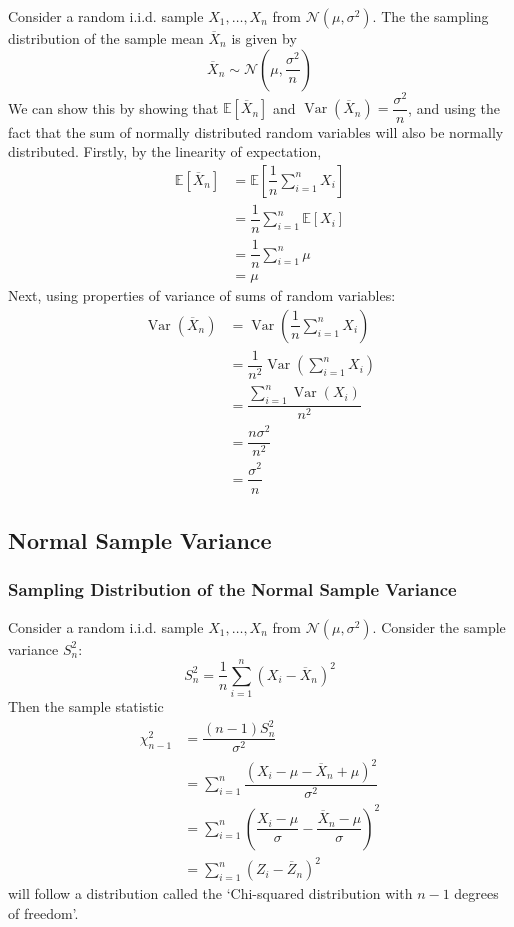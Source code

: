 \documentclass[11pt]{report} %
\begin{document}
Consider a random i.i.d. sample $X_{1}, \dots, X_{n}$ from $\mathcal{N}\left(\mu, \sigma^{2}\right)$. The the sampling distribution of the sample mean $\overline{X}_{n}$ is given by
\begin{equation}
\overline{X}_{n} \sim \mathcal{N}\left(\mu, \dfrac{\sigma^{2}}{n}\right)
\end{equation}
We can show this by showing that $\mathbb{E}\left[\overline{X}_{n}\right]$ and $\operatorname{Var}\left(\overline{X}_{n}\right) = \dfrac{\sigma^{2}}{n}$, and using the fact that the sum of normally distributed random variables will also be normally distributed. Firstly, by the linearity of expectation,
\begin{align}
\mathbb{E}\left[\overline{X}_{n}\right] &= \mathbb{E}\left[\dfrac{1}{n}\sum_{i = 1}^{n}X_{i}\right] \\
&= \dfrac{1}{n}\sum_{i = 1}^{n}\mathbb{E}\left[X_{i}\right] \\
&= \dfrac{1}{n}\sum_{i = 1}^{n}\mu \\
&= \mu
\end{align}
Next, using properties of variance of sums of random variables:
\begin{align}
\operatorname{Var}\left(\overline{X}_{n}\right) &= \operatorname{Var}\left(\dfrac{1}{n}\sum_{i = 1}^{n}X_{i}\right) \\
&= \dfrac{1}{n^{2}}\operatorname{Var}\left(\sum_{i = 1}^{n}X_{i}\right) \\
&= \dfrac{\sum_{i = 1}^{n}\operatorname{Var}\left(X_{i}\right)}{n^{2}} \\
&= \dfrac{n\sigma^{2}}{n^{2}} \\
&= \dfrac{\sigma^{2}}{n}
\end{align}

\subsection{Normal Sample Variance}

\subsubsection{Sampling Distribution of the Normal Sample Variance}

Consider a random i.i.d. sample $X_{1}, \dots, X_{n}$ from $\mathcal{N}\left(\mu, \sigma^{2}\right)$. Consider the sample variance $S_{n}^{2}$:
\begin{equation}
S_{n}^{2} = \dfrac{1}{n}\sum_{i = 1}^{n}\left(X_{i} - \overline{X}_{n}\right)^{2}
\end{equation}
Then the sample statistic
\begin{align}
\chi_{n - 1}^{2} &= \dfrac{\left(n - 1\right)S_{n}^{2}}{\sigma^{2}} \\
&= \sum_{i = 1}^{n}\dfrac{\left(X_{i} - \mu - \overline{X}_{n} + \mu\right)^{2}}{\sigma^{2}} \\
&= \sum_{i = 1}^{n}\left(\dfrac{X_{i} - \mu}{\sigma} - \dfrac{\overline{X}_{n} - \mu}{\sigma}\right)^{2} \\
&= \sum_{i = 1}^{n}\left(Z_{i} - \overline{Z}_{n}\right)^{2}
\end{align}
will follow a distribution called the `Chi-squared distribution with $n - 1$ degrees of freedom'.
\end{document}
